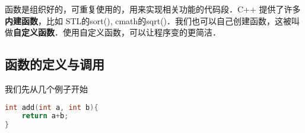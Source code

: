 
函数是组织好的，可重复使用的，用来实现相关功能的代码段．C++ 提供了许多\textbf{内建函数}，比如 STL的sort(), cmath的sqrt()．我们也可以自己创建函数，这被叫做\textbf{自定义函数}．使用自定义函数，可以让程序变的更简洁．

\subsection{函数的定义与调用}
我们先从几个例子开始
\begin{lstlisting}[language=cpp]
int add(int a, int b){
    return a+b;
}
\end{lstlisting}